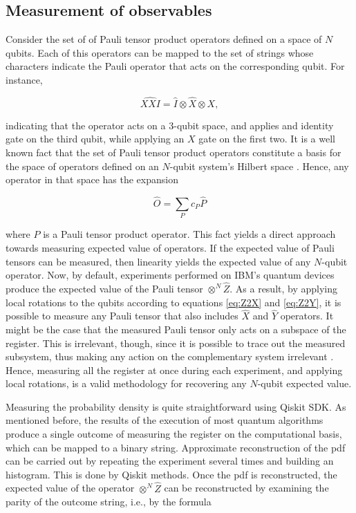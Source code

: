   \subsection{Measurement of observables}
  \label{subsec:MeasurementMethods}

    Consider the set of of Pauli tensor product operators defined on a space of $N$ qubits. Each of this operators can be mapped to the set of strings whose characters indicate the Pauli operator that acts on the corresponding qubit. For instance,

    \begin{equation}
      \hat{XXI} = \hat{I} \otimes \hat{X} \otimes{X},
    \end{equation}

    \noindent indicating that the operator acts on a 3-qubit space, and applies and identity gate on the third qubit, while applying an $X$ gate on the first two. It is a well known fact that the set of Pauli tensor product operators constitute a basis for the space of operators defined on an $N$-qubit system's Hilbert space \cite{Nielsen, Strini}. Hence, any operator in that space has the expansion
    
    \begin{equation}
      \hat{O} = \sum_{P} c_P \hat{P}
    \end{equation}

    \noindent where $P$ is a Pauli tensor product operator. This fact yields a direct approach towards measuring expected value of operators. If the expected value of Pauli tensors can be measured, then linearity yields the expected value of any $N$-qubit operator. Now, by default, experiments performed on IBM's quantum devices produce the expected value of the Pauli tensor $\otimes^{N} \hat{Z}$. As a result, by applying local rotations to the qubits according to equations \ref{eq:Z2X} and \ref{eq:Z2Y}, it is possible to measure any Pauli tensor that also includes $\hat{X}$ and $\hat{Y}$ operators. It might be the case that the measured Pauli tensor only acts on a subspace of the register. This is irrelevant, though, since it is possible to trace out the measured subsystem, thus making any action on the complementary system irrelevant \cite{Nielsen}. Hence, measuring all the register at once during each experiment, and applying local rotations, is a valid methodology for recovering any $N$-qubit expected value.

    Measuring the probability density is quite straightforward using Qiskit SDK. As mentioned before, the results of the execution of most quantum algorithms produce a single outcome of measuring the register on the computational basis, which can be mapped to a binary string. Approximate reconstruction of the pdf can be carried out by repeating the experiment several times and building an histogram. This is done by Qiskit methods. Once the pdf is reconstructed, the expected value of the operator $\otimes^{N} \hat{Z}$ can be reconstructed by examining the parity of the outcome string, i.e., by the formula
    
